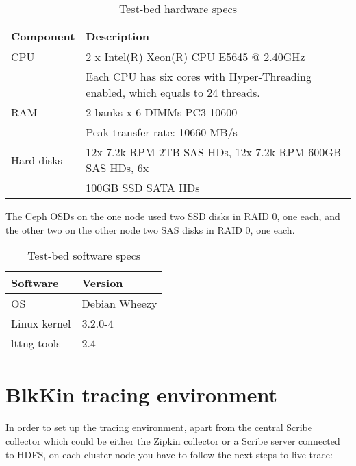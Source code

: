 \begin{table}[H]
    \centering
    \begin{tabular}{ | l | l | }
        \hline
        Component & Description \\ \hline \hline
        CPU &  2 x Intel(R) Xeon(R) CPU E5645 @ 2.40GHz \cite{e5645} \\
         & Each CPU has six cores with Hyper-Threading enabled, which equals to 
         24 threads. \\ \hline
        RAΜ & 2 banks x 6 DIMMs PC3-10600 \\
        & Peak transfer rate: 10660 MB/s \\ \hline
        Hard disks & 12x 7.2k RPM 2TB SAS HDs, 12x 7.2k RPM 600GB SAS HDs, 6x \\
        & 100GB SSD SATA HDs \\ \hline
    \end{tabular}
    \caption{Test-bed hardware specs}
    \label{tab:hardware-specs}
\end{table}

The Ceph OSDs on the one node used two SSD disks in RAID 0, one each, and the
other two on the other node two SAS disks in RAID 0, one each.

\begin{table}[H]
    \centering
    \begin{tabular}{ | l | l | }
        \hline
        Software & Version \\ \hline \hline
        OS &  Debian Wheezy \\ \hline
        Linux kernel & 3.2.0-4 \\ \hline
        lttng-tools & 2.4 \\ \hline
    \end{tabular}
    \caption{Test-bed software specs}
    \label{tab:software-specs}
\end{table}

\section{BlkKin tracing environment}
In order to set up the tracing environment, apart from the central Scribe
collector which could be either the Zipkin collector or a Scribe server
connected to HDFS, on each cluster node you have to follow the next steps to
live trace:

